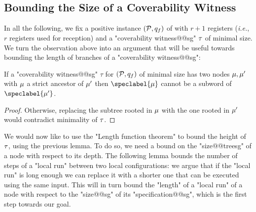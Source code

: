 \subsection{Bounding the Size of a Coverability Witness}
In all the following, we fix a positive instance $(\mathcal{P},q_f)$ of \COVER with $r+1$ registers (\emph{i.e.}, $r$ registers used for reception) and a  "coverability witness@@sg" $\tau$ of minimal size.
We turn the observation above into an argument that will be useful towards bounding the length of branches of a "coverability witness@@sg": 

\begin{lemma}
\label{lem:no_subword_in_branch_sg}
If a "coverability witness@@sg" $\tau$ for $(\mathcal{P}, q_f)$ of minimal size has two nodes $\mu, \mu'$ with $\mu$ a strict ancestor of $\mu'$ then  $\speclabel{\node}$ cannot be a subword of $\speclabel{\node'}$. 
\end{lemma}
\begin{proof}
Otherwise, replacing the subtree rooted in $\mu$ with the one rooted in $\mu'$ would contradict minimality of $\tau$.
\end{proof}

We would now like to use the "Length function theorem" to bound the height of $\tau$, using the previous lemma. To do so, we need a bound on the "size@@treesg" of a node with respect to its depth. The following lemma bounds the number of steps of a "local run" between two local configurations: we argue that if the "local run" is long enough we can replace it with a shorter one that can be executed using the same input. This will in turn bound the "length" of a "local run" of a node with respect to the "size@@sg" of its "specification@@sg", which is the first step towards our goal.


